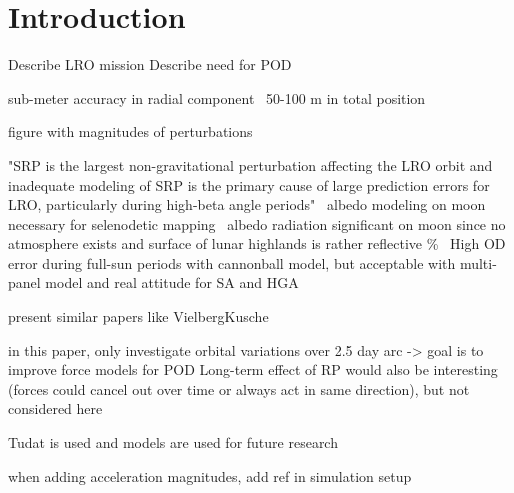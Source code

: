 \section{Introduction}

Describe LRO mission
Describe need for POD

sub-meter accuracy in radial component~\cite{Zuber2009}
50-100 m in total position~\cite{Chin2007}

figure with magnitudes of perturbations

"SRP is the largest non-gravitational perturbation affecting the LRO orbit and inadequate modeling of SRP is the primary cause of large prediction errors for LRO, particularly during high-beta angle periods"~\cite{Slojkowski2015}
albedo modeling on moon necessary for selenodetic mapping~\cite{Floberghagen1999}
albedo radiation significant on moon since no atmosphere exists and surface of lunar highlands is rather reflective \%~\cite{Floberghagen1999}
High OD error during full-sun periods with cannonball model, but acceptable with multi-panel model and real attitude for SA and HGA~\cite[]{Slojkowski2014}

present similar papers like VielbergKusche

in this paper, only investigate orbital variations over 2.5 day arc -> goal is to improve force models for POD
Long-term effect of RP would also be interesting (forces could cancel out over time or always act in same direction), but not considered here

\gls{Tudat} is used and models are used for future research


when adding acceleration magnitudes, add ref in simulation setup